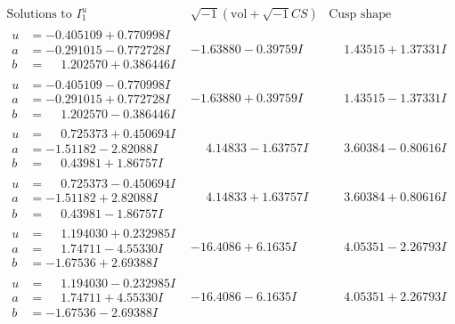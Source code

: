 \documentclass[1p]{elsarticle_modified}
\theoremstyle{definition}
\newcommand{\I}{\sqrt{-1}}
\begin{document}
$$\begin{array}{c|c|c}  
\text{Solutions to }I^u_{1}& \I (\text{vol} + \sqrt{-1}CS) & \text{Cusp shape}\\
 \hline 
\begin{aligned}
u &= -0.405109 + 0.770998 I \\
a &= -0.291015 - 0.772728 I \\
b &= \phantom{-}1.202570 + 0.386446 I\end{aligned}
 & -1.63880 - 0.39759 I & \phantom{-}1.43515 + 1.37331 I \\ \hline\begin{aligned}
u &= -0.405109 - 0.770998 I \\
a &= -0.291015 + 0.772728 I \\
b &= \phantom{-}1.202570 - 0.386446 I\end{aligned}
 & -1.63880 + 0.39759 I & \phantom{-}1.43515 - 1.37331 I \\ \hline\begin{aligned}
u &= \phantom{-}0.725373 + 0.450694 I \\
a &= -1.51182 - 2.82088 I \\
b &= \phantom{-}0.43981 + 1.86757 I\end{aligned}
 & \phantom{-}4.14833 - 1.63757 I & \phantom{-}3.60384 - 0.80616 I \\ \hline\begin{aligned}
u &= \phantom{-}0.725373 - 0.450694 I \\
a &= -1.51182 + 2.82088 I \\
b &= \phantom{-}0.43981 - 1.86757 I\end{aligned}
 & \phantom{-}4.14833 + 1.63757 I & \phantom{-}3.60384 + 0.80616 I \\ \hline\begin{aligned}
u &= \phantom{-}1.194030 + 0.232985 I \\
a &= \phantom{-}1.74711 - 4.55330 I \\
b &= -1.67536 + 2.69388 I\end{aligned}
 & -16.4086 + 6.1635 I & \phantom{-}4.05351 - 2.26793 I \\ \hline\begin{aligned}
u &= \phantom{-}1.194030 - 0.232985 I \\
a &= \phantom{-}1.74711 + 4.55330 I \\
b &= -1.67536 - 2.69388 I\end{aligned}
 & -16.4086 - 6.1635 I & \phantom{-}4.05351 + 2.26793 I \\ \hline\begin{aligned}

\end{aligned}
\end{array}$$
\end{document}
